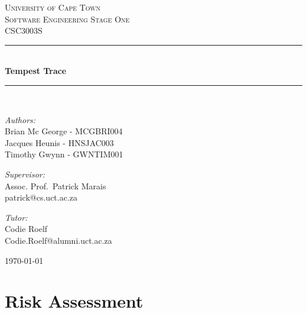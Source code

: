 \documentclass[a4paper,10pt]{article}
\begin{document}
\begin{titlepage} \begin{center} 
		\textsc{\LARGE University of Cape Town}
		\\[1.5cm] \textsc{\Large Software Engineering Stage One\\CSC3003S}
		\\[0.5cm]
		\noindent\rule[0.4mm]{\textwidth}{0.1mm}
		\\[0.4cm] { \huge \bfseries Tempest Trace \\[0.4cm] }
		\noindent\rule[0.4mm]{\textwidth}{0.1mm}
		\\[1cm]
		\begin{minipage}[t]{0.4\textwidth}
		\begin{flushleft}\large \emph{Authors:}\\ Brian Mc George - MCGBRI004 \\ Jacques Heunis - HNSJAC003 \\ Timothy Gwynn - GWNTIM001\end{flushleft}
		 \end{minipage} \begin{minipage}[t]{0.4\textwidth} 
		\begin{flushright} \large \emph{Supervisor:} \\ Assoc. Prof.~Patrick Marais\\patrick@cs.uct.ac.za\end{flushright}
		\begin{flushright} \large \emph{Tutor:} \\ Codie Roelf\\Codie.Roelf@alumni.uct.ac.za\end{flushright}
		 \end{minipage} \vfill {\large \today}
		\end{center}
		\end{titlepage}
\newpage
\tableofcontents
\newpage

\section{Risk Assessment}
\end{document}
